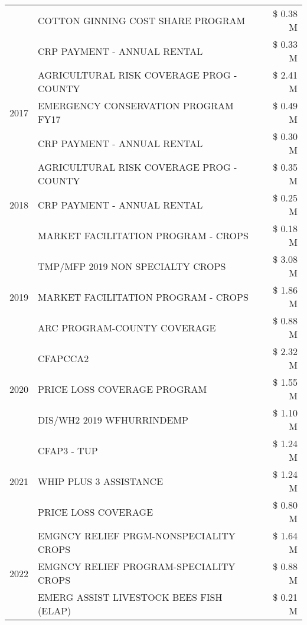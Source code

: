 \begin{tabular}{llr}
 & COTTON GINNING COST SHARE PROGRAM & \$ 0.38 M \\
 & CRP PAYMENT - ANNUAL RENTAL & \$ 0.33 M \\
\cline{1-3}
\multirow[t]{3}{*}{2017} & AGRICULTURAL RISK COVERAGE PROG - COUNTY & \$ 2.41 M \\
 & EMERGENCY CONSERVATION PROGRAM FY17 & \$ 0.49 M \\
 & CRP PAYMENT - ANNUAL RENTAL & \$ 0.30 M \\
\cline{1-3}
\multirow[t]{3}{*}{2018} & AGRICULTURAL RISK COVERAGE PROG - COUNTY & \$ 0.35 M \\
 & CRP PAYMENT - ANNUAL RENTAL & \$ 0.25 M \\
 & MARKET FACILITATION PROGRAM - CROPS & \$ 0.18 M \\
\cline{1-3}
\multirow[t]{3}{*}{2019} & TMP/MFP 2019 NON SPECIALTY CROPS & \$ 3.08 M \\
 & MARKET FACILITATION PROGRAM - CROPS & \$ 1.86 M \\
 & ARC PROGRAM-COUNTY COVERAGE & \$ 0.88 M \\
\cline{1-3}
\multirow[t]{3}{*}{2020} & CFAPCCA2 & \$ 2.32 M \\
 & PRICE LOSS COVERAGE PROGRAM & \$ 1.55 M \\
 & DIS/WH2 2019 WFHURRINDEMP & \$ 1.10 M \\
\cline{1-3}
\multirow[t]{3}{*}{2021} & CFAP3 - TUP & \$ 1.24 M \\
 & WHIP PLUS 3 ASSISTANCE & \$ 1.24 M \\
 & PRICE LOSS COVERAGE & \$ 0.80 M \\
\cline{1-3}
\multirow[t]{3}{*}{2022} & EMGNCY RELIEF PRGM-NONSPECIALITY CROPS & \$ 1.64 M \\
 & EMGNCY RELIEF PROGRAM-SPECIALITY CROPS & \$ 0.88 M \\
 & EMERG ASSIST LIVESTOCK BEES FISH (ELAP) & \$ 0.21 M \\
\cline{1-3}
\bottomrule
\end{tabular}
